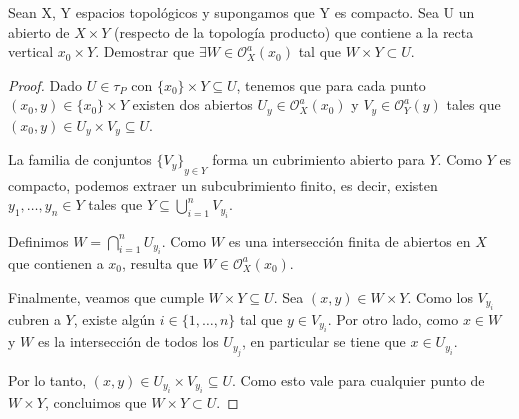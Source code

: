 \documentclass{article}
\theoremstyle{plain}
\theoremstyle{definition}
\newenvironment{ejercicio}[1]{\begin{trivlist}
\item[\hskip \labelsep {\bfseries Ejercicio}\hskip \labelsep {\bfseries #1.}]}{\end{trivlist}}
\begin{document}
\clearpage

\begin{ejercicio}{2 (Lema del tubo)}
    Sean X, Y espacios topológicos y supongamos que Y es compacto. Sea U un abierto de \( X \times Y \) (respecto de la topología producto) que contiene a la recta vertical \( x_{0}\times Y \). Demostrar que \( \exists W \in \mathcal{O}_{X}^{a}(x_{0}) \) tal que \( W \times Y \subset U \).
\end{ejercicio}
\begin{proof}
    Dado \( U \in \tau_P \) con \( \{ x_0 \} \times Y \subseteq U \), tenemos que para cada punto \( (x_0, y) \in \{ x_0 \} \times Y \) existen dos abiertos \( U_{y} \in \mathcal{O}_X^a(x_0) \) y \( V_{y} \in \mathcal{O}_Y^a(y) \) tales que \( (x_0, y) \in U_{y} \times V_{y} \subseteq U \).

    La familia de conjuntos \( {\{ V_{y} \}}_{y \in Y} \) forma un cubrimiento abierto para \( Y \). Como \( Y \) es compacto, podemos extraer un subcubrimiento finito, es decir, existen \( y_1, \ldots, y_n \in Y \) tales que \( Y \subseteq \bigcup_{i = 1}^n V_{y_i} \).

    Definimos \( W = \bigcap_{i = 1}^n U_{y_i} \). Como \( W \) es una intersección finita de abiertos en \( X \) que contienen a \( x_0 \), resulta que \( W \in \mathcal{O}_X^a(x_0) \).

    Finalmente, veamos que cumple \( W \times Y \subseteq U \). Sea \( (x, y) \in W \times Y \). Como los \( V_{y_i} \) cubren a \( Y \), existe algún \( i \in \{1, \ldots, n\} \) tal que \( y \in V_{y_i} \). Por otro lado, como \( x \in W \) y \( W \) es la intersección de todos los \( U_{y_j} \), en particular se tiene que \( x \in U_{y_i} \).

    Por lo tanto, \( (x, y) \in U_{y_i} \times V_{y_i} \subseteq U \). Como esto vale para cualquier punto de \( W \times Y \), concluimos que \( W \times Y \subset U \).
\end{proof}
\end{document}
